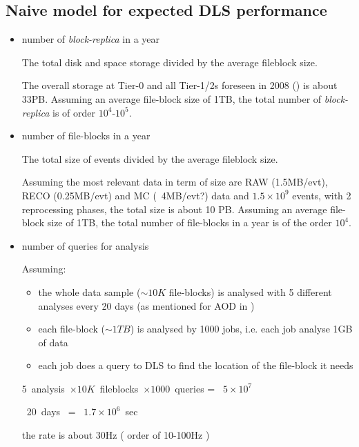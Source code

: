 \documentclass[pdftex]{cmspaper}
\begin{document}
\subsection{ Naive model for expected DLS performance}

\begin{itemize}

\item number of {\em block-replica} in a year

  The total disk and space storage divided by the average fileblock size.

  The overall storage at Tier-0 and all Tier-1/2s foreseen in 2008 (\cite{CTDR})  is about 33PB. Assuming an average file-block size of 1TB, the
  total number of {\em block-replica} is of order $10^{4}$-$10^{5}$.

\item number of file-blocks in a year

  The total size of events divided by the average fileblock size.

  Assuming the most relevant data in term of size are RAW (1.5MB/evt),
  RECO (0.25MB/evt) and MC (~4MB/evt?) data and $1.5 \times 10^{9}$ events,
  with 2 reprocessing phases, the total size is about 10 PB.
  Assuming an average file-block size of 1TB, the
  total number of file-blocks in a year is of the order $10^{4}$.

%
\item number of queries for analysis

 Assuming:
 \begin{itemize}
  \item the whole data sample ($\sim 10K$ file-blocks) is analysed
        with 5 different analyses every 20 days (as mentioned for AOD in \cite{CM})
  \item each file-block ($\sim 1TB$) is analysed by 1000 jobs, i.e. each job
        analyse 1GB of data
  \item each job does a query to DLS to find the location of the file-block it needs
 \end{itemize}

 \mbox{5 analysis $\times 10K$ fileblocks $\times 1000$ queries} = \mbox{ $5 \times 10^{7}$ }

 \mbox{ 20 days } = \mbox{ $1.7 \times 10^{6}$ sec}

 the rate is about 30Hz ( order of 10-100Hz )

\end{itemize}
\end{document}
